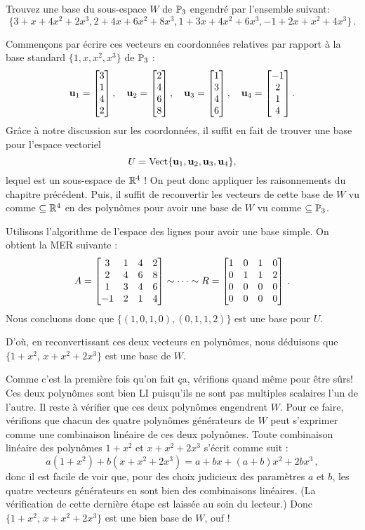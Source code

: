 \begin{myprob} Trouvez une base du sous-espace $W$ de $\mathbb{P}_3$ engendr\'e par l'ensemble suivant:
$$
\{ 3+x+4x^2+2x^3, 2+4x+6x^2+8x^3, 1+3x+4x^2+6x^3, -1+2x +x^2 + 4x^3\}\,.
$$

\begin{mysol} Commençons par écrire ces vecteurs en coordonnées relatives par rapport à
la base standard $\{1,x,x^2,x^3\}$ de $\mathbb{P}_3$ :
$$
\mathbf{u}_1 = \left[ \begin{matrix} 3\\1\\4\\2 \end{matrix} \right], \quad\mathbf{u}_2=\left[ \begin{matrix} 2\\4\\6\\8 \end{matrix} \right], \quad\mathbf{u}_3=\left[ \begin{matrix} 1\\3\\4\\6 \end{matrix} \right], \quad\mathbf{u}_4=\left[ \begin{matrix} -1\\2\\1\\4 \end{matrix} \right].
$$
Grâce à notre discussion sur les coordonnées, il suffit en fait de 
trouver une base pour l'espace vectoriel
$$
U = \textrm{Vect}\{ \mathbf{u}_1, \mathbf{u}_2,\mathbf{u}_3,\mathbf{u}_4\},
$$
lequel est un sous-espace de $\mathbb{R}^4$ ! On peut donc appliquer les raisonnements du chapitre précédent. Puis, il suffit de reconvertir les vecteurs de cette base de $W$ vu comme $\subseteq \mathbb{R}^4$ en des polyn\^omes pour avoir une base de $W$ vu comme $\subseteq \mathbb{P}_3$.

Utilisons l'algorithme de l'espace des lignes pour avoir une base simple. On obtient la MER suivante :
$$
A = \left[ \begin{matrix} 
3&1&4&2\\
2&4&6&8\\
1&3&4&6\\
-1&2&1&4 \end{matrix} \right] \sim \cdots \sim R= \left[ \begin{matrix} 1&0&1&0\\0&1&1&2\\0&0&0&0\\0&0&0&0 \end{matrix} \right]\,.
$$
Nous concluons donc que $\{ (1,0,1,0), (0,1,1,2)\}$ est une base pour $U$.

D'o\`u, en reconvertissant ces deux vecteurs en polyn\^omes, nous déduisons que $\{ 1+x^2,\, x+x^2+2x^3\}$ est une base de $W$.

Comme c'est la première fois qu'on fait ça, vérifions quand même pour être sûrs!  Ces deux polynômes sont bien LI puisqu'ils ne sont pas multiples scalaires l'un de l'autre. Il reste à vérifier que ces deux polynômes engendrent $W$. Pour ce faire, vérifions que chacun des quatre polynômes g\'en\'erateurs de $W$ peut s'exprimer comme une combinaison linéaire
de ces deux polynômes.  Toute combinaison lin\'eaire des polynômes  $1+x^2$ et $x+x^2+2x^3$ s'\'ecrit comme suit :
$$
a(1+x^2) + b(x+x^2+2x^3) = a + bx + (a+b)x^2 + 2bx^3\,,
$$
donc il est facile de voir que, pour des choix judicieux des paramètres $a$ et $b$, les quatre vecteurs g\'en\'erateurs en sont bien des combinaisons lin\'eaires.
(La vérification de cette derni\`ere \'etape est laiss\'ee au soin du lecteur.) Donc $\{ 1+x^2,\, x+x^2+2x^3\}$ est une bien base de $W$, ouf !

\end{mysol}\end{myprob}

